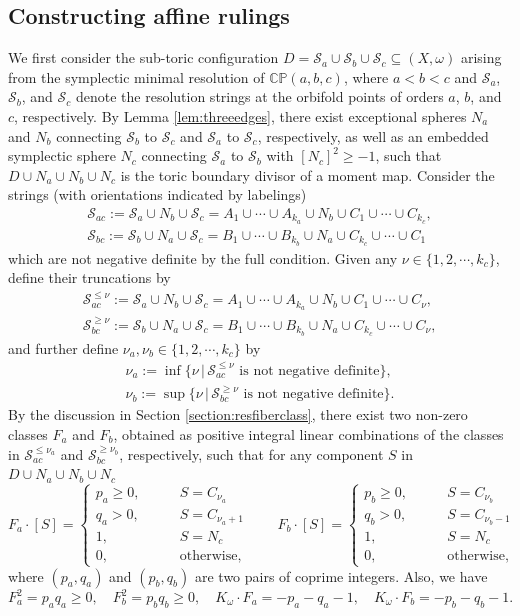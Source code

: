 \documentclass[11pt]{article}
\theoremstyle{definition}
\theoremstyle{remark}
\newcommand{\CP}{\mathbb{CP}}
\newcommand{\st}{\mathcal{S}}
\begin{document}
\subsection{Constructing affine rulings}
 We first consider the sub-toric configuration $D=\st_a\cup\st_b\cup\st_c\subseteq (X,\omega)$ arising from the symplectic minimal resolution of $\CP(a,b,c)$, where $a<b<c$ and $\st_a$, $\st_b$, and $\st_c$ denote the resolution strings at the orbifold points of orders $a$, $b$, and $c$, respectively. By Lemma \ref{lem:threeedges}, there exist exceptional spheres $N_a$ and $N_b$ connecting $\st_b$ to $\st_c$ and $\st_a$ to $\st_c$, respectively, as well as an embedded symplectic sphere $N_c$ connecting $\st_a$ to $\st_b$ with $[N_c]^2\geq -1$, such that $D\cup N_a\cup N_b\cup N_c$ is the toric boundary divisor of a moment map.
Consider the strings (with orientations indicated by labelings)
\begin{align*}
\st_{ac}:=\st_a\cup N_b\cup\st_c=A_1\cup\cdots\cup A_{k_a}\cup N_b\cup C_1\cup\cdots\cup C_{k_c},\\
\st_{bc}:=\st_b\cup N_a\cup\st_c=B_1\cup\cdots\cup B_{k_b}\cup N_a\cup C_{k_c}\cup\cdots\cup C_{1}
\end{align*} which are not negative definite by the full condition. Given any $\nu\in\{1,2,\cdots,k_c\}$, define their truncations by
\begin{align*}
\st_{ac}^{\leq\nu}:=\st_a\cup N_b\cup\st_c=A_1\cup\cdots\cup A_{k_a}\cup N_b\cup C_1\cup\cdots\cup C_{\nu},\\
\st_{bc}^{\geq\nu}:=\st_b\cup N_a\cup\st_c=B_1\cup\cdots\cup B_{k_b}\cup N_a\cup C_{k_c}\cup\cdots\cup C_{\nu},
\end{align*}and further define $\nu_a,\nu_b\in\{1,2,\cdots,k_c\}$ by
\begin{align*}
\nu_a:=\inf\{\nu\,|\,\st_{ac}^{\leq\nu} \text{ is not negative definite}\},\\
\nu_b:=\sup\{\nu\,|\,\st_{bc}^{\geq\nu} \text{ is not negative definite}\}.
\end{align*}
By the discussion in Section \ref{section:resfiberclass}, there exist two non-zero classes $F_a$ and $F_b$, obtained as positive integral linear combinations of the classes in $\st_{ac}^{\leq\nu_a}$ and $\st_{bc}^{\geq\nu_b}$, respectively, such that for any component $S$ in $D\cup N_a\cup N_b\cup N_c$
\[ F_a\cdot [S]=\begin{cases}
  p_a \geq 0,\qquad & S=C_{\nu_a}\\
  q_a >0 ,\qquad & S=C_{\nu_a+1}\\
  1,\qquad & S=N_c\\
  0,\qquad & \text{otherwise,}\end{cases}\qquad 
  F_b\cdot [S]=\begin{cases}
  p_b \geq 0,\qquad & S=C_{\nu_b}\\
  q_b > 0 ,\qquad & S=C_{\nu_b-1}\\
  1,\qquad & S=N_c\\
  0,\qquad & \text{otherwise,}
\end{cases}\]
where $(p_a,q_a)$ and $(p_b,q_b)$ are two pairs of coprime integers. Also, we have \[F_a^2=p_aq_a\geq 0,\quad F_b^2=p_bq_b\geq 0, \quad K_\omega\cdot F_a=-p_a-q_a-1,\quad K_\omega\cdot F_b=-p_b-q_b-1.\]
\end{document}
